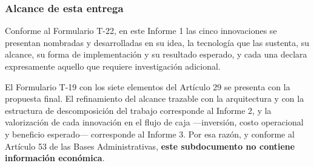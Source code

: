 \subsubsection{Alcance de esta entrega}

Conforme al Formulario T-22, en este Informe 1 las cinco innovaciones se
presentan nombradas y desarrolladas en su idea, la tecnología que las sustenta,
su alcance, su forma de implementación y su resultado esperado, y cada una
declara expresamente aquello que requiere investigación adicional.

El Formulario T-19 con los siete elementos del Artículo 29\textdegree{} se
presenta con la propuesta final. El refinamiento del alcance trazable con la
arquitectura y con la estructura de descomposición del trabajo corresponde al
Informe 2, y la valorización de cada innovación en el flujo de caja
—inversión, costo operacional y beneficio esperado— corresponde al Informe 3.
Por esa razón, y conforme al Artículo 53\textdegree{} de las Bases
Administrativas, \textbf{este subdocumento no contiene información económica}.
